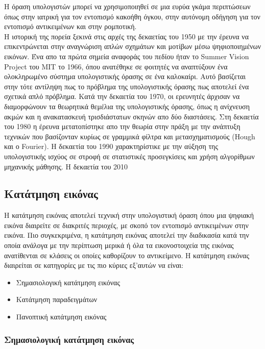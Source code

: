 \documentclass[12pt]{article}
\begin{document}
Η όραση υπολογιστών μπορεί να χρησιμοποιηθεί σε μια ευρύα γκάμα περιπτώσεων όπως στην ιατρική για τον εντοπισμό κακοήθη όγκου, στην αυτόνομη οδήγηση για τον εντοπισμό αντικειμένων και στην ρομποτική. \\

Η ιστορική της πορεία ξεκινά στις αρχές της δεκαετίας του 1950 με την έρευνα να επικεντρώνεται στην αναγνώριση απλών σχημάτων και μοτίβων μέσω ψηφιοποιημένων εικόνων. Ένα απο τα πρώτα σημεία αναφοράς του πεδίου ήταν το Summer Vision Project του ΜΙΤ το 1966, όπου ανατέθηκε σε φοιτητές να αναπτύξουν ένα ολοκληρωμένο σύστημα υπολογιστικής όρασης σε ένα καλοκαίρι. Αυτό βασίζεται στην τότε αντίληψη πως το πρόβλημα της υπολογιστικής όρασης πως αποτελεί ένα σχετικά απλό πρόβλημα. Κατά την δεκαετία του 1970, οι ερευνητές άρχισαν να διαμορφώνουν τα θεωρητικά θεμέλια της υπολογιστικής όρασης, όπως η ανίχνευση ακμών και η ανακατασκευή τρισδιάστατων σκηνών απο δύο διαστάσεις. Στη δεκαετία του 1980 η έρευνα μετατοπίστηκε απο την θεωρία στην πράξη με την ανάπτυξη τεχνικών που βασίζονταν κυρίως σε γραμμικά φίλτρα και μετασχηματισμούς (Hough και ο Fourier). Η δεκαετία του 1990 χαρακτηρίστικε με την αύξηση της υπολογιστικής ισχύος σε στροφή σε στατιστικές προσεγκίσεις και χρήση αλγορίθμων μηχανικής μάθησης. Η δεκαετία του 2010

\subsection{Κατάτμηση εικόνας}

Η κατάτμηση εικόνας αποτελεί τεχνική στην υπολογιστική όραση όπου μια ψηφιακή εικόνα διαιρείτε σε διακριτές περιοχές, με σκοπό τον εντοπισμό αντικειμένων στην εικόνα. Πιο συγκεκριμένα, η κατάτμηση εικόνας αποτελεί την διαδικασία κατά την οποία ανάλογα με την περίπτωση μερικά ή όλα τα εικονοστοιχεία της εικόνας ανατίθενται σε κλάσεις οι οποίες καθορίζουν το αντικείμενο. Η κατάτμηση εικόνας διαιρείται σε κατηγορίες με τις πιο κύριες εξ'αυτών να είναι:

\begin{itemize}
    \item Σημασιολογική κατάτμηση εικόνας
    \item Κατάτμηση παραδειγμάτων
    \item Πανοπτική κατάτμηση εικόνας
\end{itemize}

\subsubsection{Σημασιολογική κατάτμηση εικόνας}
\end{document}

